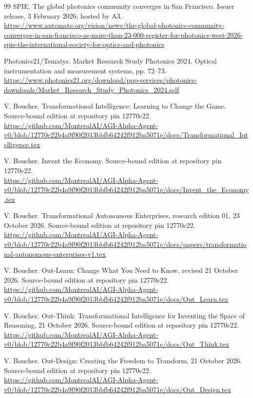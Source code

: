 \begin{thebibliography}{99}
 SPIE. The global photonics community converges in San Francisco. Issuer release, 3 February 2026; hosted by A3.\\\url{https://www.automate.org/vision/news/the-global-photonics-community-converges-in-san-francisco-as-more-than-23-000-register-for-photonics-west-2026-spie-the-international-society-for-optics-and-photonics}

 Photonics21/Tematys. Market Research Study Photonics 2024. Optical instrumentation and measurement systems, pp. 72--73.\\\url{https://www.photonics21.org/download/ppp-services/photonics-downloads/Market_Research_Study_Photonics_2024.pdf}

 V. Boucher. Transformational Intelligence: Learning to Change the Game. Source-bound edition at repository pin 12770c22.\\\url{https://github.com/MontrealAI/AGI-Alpha-Agent-v0/blob/12770c22b4a9f90f2013bbfb64242f912ba5071e/docs/Transformational_Intelligence.tex}

 V. Boucher. Invent the Economy. Source-bound edition at repository pin 12770c22.\\\url{https://github.com/MontrealAI/AGI-Alpha-Agent-v0/blob/12770c22b4a9f90f2013bbfb64242f912ba5071e/docs/Invent_the_Economy.tex}

 V. Boucher. Transformational Autonomous Enterprises, research edition 01, 23 October 2026. Source-bound edition at repository pin 12770c22.\\\url{https://github.com/MontrealAI/AGI-Alpha-Agent-v0/blob/12770c22b4a9f90f2013bbfb64242f912ba5071e/docs/papers/transformational-autonomous-enterprises-v1.tex}

 V. Boucher. Out-Learn: Change What You Need to Know, revised 21 October 2026. Source-bound edition at repository pin 12770c22.\\\url{https://github.com/MontrealAI/AGI-Alpha-Agent-v0/blob/12770c22b4a9f90f2013bbfb64242f912ba5071e/docs/Out_Learn.tex}

 V. Boucher. Out-Think: Transformational Intelligence for Inventing the Space of Reasoning, 21 October 2026. Source-bound edition at repository pin 12770c22.\\\url{https://github.com/MontrealAI/AGI-Alpha-Agent-v0/blob/12770c22b4a9f90f2013bbfb64242f912ba5071e/docs/Out_Think.tex}

 V. Boucher. Out-Design: Creating the Freedom to Transform, 21 October 2026. Source-bound edition at repository pin 12770c22.\\\url{https://github.com/MontrealAI/AGI-Alpha-Agent-v0/blob/12770c22b4a9f90f2013bbfb64242f912ba5071e/docs/Out_Design.tex}


\end{thebibliography}
